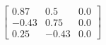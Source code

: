 \documentclass[preview]{standalone}
\begin{document}
\begin{align*}
\left[ \begin{array}{ccc}0.87 & 0.5 & 0.0 \\ -0.43 & 0.75 & 0.0 \\ 0.25 & -0.43 & 0.0\end{array} \right]
\end{align*}
\end{document}
